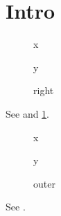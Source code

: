 \documentclass{article}
\begin{document}
\section{Intro}\label{sec}\label{other}
\begin{figure}
\begin{minipage}{4cm}x\caption{left}\end{minipage}\hfill\begin{minipage}{4cm}y\caption{right}\end{minipage}
\end{figure}
See  and \cref{sec}.
\begin{figure}
\begin{minipage}{4cm}x\caption{left}\end{minipage}\hfill\begin{minipage}{4cm}y\caption{right}\end{minipage}
\caption{outer}\label{fo}
\end{figure}
See .
\end{document}
